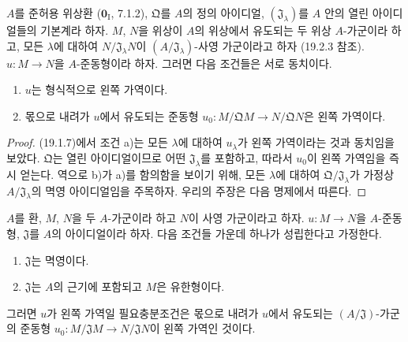 \begin{proposition}[19.1.9]
\label{0.19.1.9-fr}
$A$를 준허용 위상환 ($\mathbf{0}_{\mathrm I}$, 7.1.2),
$\mathfrak Q$를 $A$의 정의 아이디얼,
$(\mathfrak J_\lambda)$를 $A$ 안의 열린 아이디얼들의 기본계라 하자.
$M$, $N$을 위상이 $A$의 위상에서 유도되는 두 위상 $A$-가군이라
하고, 모든 $\lambda$에 대하여 $N/\mathfrak J_\lambda N$이
$(A/\mathfrak J_\lambda)$-사영 가군이라고 하자 (19.2.3 참조).
$u:M\to N$을 $A$-준동형이라 하자. 그러면 다음 조건들은 서로
동치이다.
\begin{enumerate}
  \item[a)] $u$는 형식적으로 왼쪽 가역이다.


  \item[b)] 몫으로 내려가 $u$에서 유도되는 준동형
  $u_0:M/\mathfrak QM\to N/\mathfrak QN$은 왼쪽 가역이다.
\end{enumerate}
\end{proposition}

\begin{proof}
(19.1.7)에서 조건 a)는 모든 $\lambda$에 대하여 $u_\lambda$가 왼쪽
가역이라는 것과 동치임을 보았다. $\mathfrak Q$는 열린 아이디얼이므로
어떤 $\mathfrak J_\lambda$를 포함하고, 따라서 $u_0$이 왼쪽 가역임을
즉시 얻는다. 역으로 b)가 a)를 함의함을 보이기 위해, 모든
$\lambda$에 대하여 $\mathfrak Q/\mathfrak J_\lambda$가 가정상
$A/\mathfrak J_\lambda$의 멱영 아이디얼임을 주목하자. 우리의 주장은
다음 명제에서 따른다.
\end{proof}

\begin{proposition}[19.1.10]
\label{0.19.1.10-fr}
$A$를 환, $M$, $N$을 두 $A$-가군이라 하고 $N$이 사영 가군이라고
하자. $u:M\to N$을 $A$-준동형, $\mathfrak J$를 $A$의 아이디얼이라
하자. 다음 조건들 가운데 하나가 성립한다고 가정한다.
\begin{enumerate}
  \item[(i)] $\mathfrak J$는 멱영이다.
  \item[(ii)] $\mathfrak J$는 $A$의 근기에 포함되고 $M$은 유한형이다.
\end{enumerate}
그러면 $u$가 왼쪽 가역일 필요충분조건은 몫으로 내려가 $u$에서
유도되는 $(A/\mathfrak J)$-가군의 준동형
$u_0:M/\mathfrak JM\to N/\mathfrak JN$이 왼쪽 가역인 것이다.
\end{proposition}

